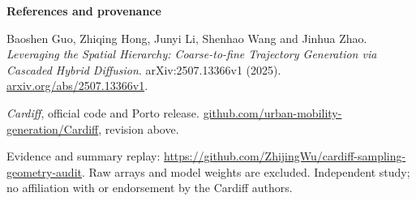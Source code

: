 \documentclass[10pt,letterpaper]{article}
\begin{document}
\vspace{3pt}
{\footnotesize
\textbf{References and provenance}\par
[1] Baoshen Guo, Zhiqing Hong, Junyi Li, Shenhao Wang and Jinhua Zhao. \emph{Leveraging the Spatial Hierarchy: Coarse-to-fine Trajectory Generation via Cascaded Hybrid Diffusion}. arXiv:2507.13366v1 (2025).
\href{https://arxiv.org/abs/2507.13366v1}{arxiv.org/abs/2507.13366v1}.\par
[2] \emph{Cardiff}, official code and Porto release.
\href{https://github.com/urban-mobility-generation/Cardiff/tree/1138b1ef0646c18e878608a848dafca018b8a888}{github.com/urban-mobility-generation/Cardiff}, revision above.\par
Evidence and summary replay: \url{https://github.com/ZhijingWu/cardiff-sampling-geometry-audit}. Raw arrays and model weights are excluded. Independent study; no affiliation with or endorsement by the Cardiff authors.
}
\end{document}
